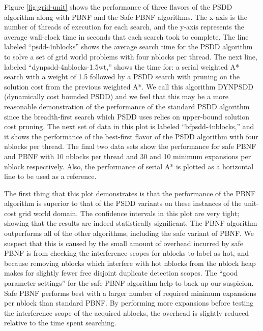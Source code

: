 \documentclass{article}
\begin{document}
 Figure \ref{fig:grid-unit} shows the performance of three flavors of
 the PSDD algorithm along with PBNF and the Safe PBNF algorithms.  The
 x-axis is the number of threads of execution for each search, and the
 y-axis represents the average wall-clock time in seconds that each
 search took to complete. The line labeled ``psdd-4nblocks'' shows the
 average search time for the PSDD algorithm to solve a set of grid
 world problems with four nblocks per thread.  The next line, labeled
 ``dynpsdd-4nblocks-1.5wt,'' shows the time for: a serial weighted A*
 search with a weight of 1.5 followed by a PSDD search with pruning on
 the solution cost from the previous weighted A*.  We call this
 algorithm DYNPSDD (dynamically cost bounded PSDD) and we feel that
 this may be a more reasonable demonstration of the performance of the
 standard PSDD algorithm since the breadth-first search which PSDD uses
 relies on upper-bound solution cost pruning.  The next set of data in
 this plot is labeled ``bfpsdd-4nblocks,'' and it shows the performance
 of the best-first flavor of the PSDD algorithm with four nblocks per
 thread.  The final two data sets show the performance for safe PBNF
 and PBNF with 10 nblocks per thread and 30 and 10 minimum expansions
 per nblock respectively.  Also, the performance of serial A* is
 plotted as a horizontal line to be used as a reference.

 The first thing that this plot demonstrates is that the performance of
 the PBNF algorithm is superior to that of the PSDD variants on these
 instances of the unit-cost grid world domain.  The confidence
 intervals in this plot are very tight; showing that the results are
 indeed statistically significant.  The PBNF algorithm outperforms all
 of the other algorithms, including the safe variant of PBNF.  We
 suspect that this is caused by the small amount of overhead incurred
 by safe PBNF is from checking the interference scopes for nblocks to
 label as hot, and because removing nblocks which interfere with hot
 nblocks from the nblock heap makes for slightly fewer free disjoint
 duplicate detection scopes.  The ``good parameter settings'' for the
 safe PBNF algorithm help to back up our suspicion.  Safe PBNF performs
 best with a larger number of required minimum expansions per nblock
 than standard PBNF.  By performing more expansions before testing the
 interference scope of the acquired nblocks, the overhead is slightly
 reduced relative to the time spent searching.
\end{document}
